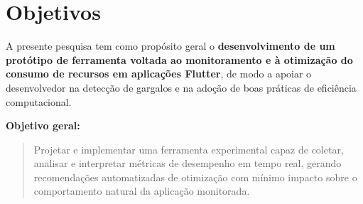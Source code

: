 \documentclass[12pt,a4paper,oneside]{abntex2}
\begin{document}
\section{Objetivos}

A presente pesquisa tem como propósito geral o \textbf{desenvolvimento de um protótipo de ferramenta voltada ao monitoramento e à otimização do consumo de recursos em aplicações Flutter}, de modo a apoiar o desenvolvedor na detecção de gargalos e na adoção de boas práticas de eficiência computacional.

\vspace{0.3cm}
\noindent\textbf{Objetivo geral:}
\begin{quote}
Projetar e implementar uma ferramenta experimental capaz de coletar, analisar e interpretar métricas de desempenho em tempo real, gerando recomendações automatizadas de otimização com mínimo impacto sobre o comportamento natural da aplicação monitorada.
\end{quote}
\end{document}
